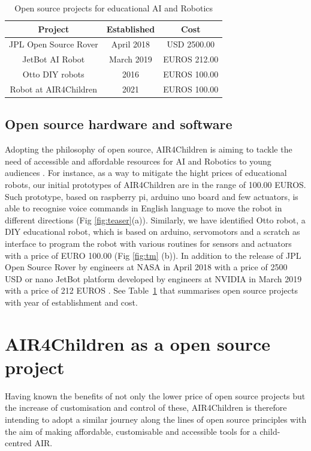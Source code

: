 \documentclass[sigconf]{acmart}
\begin{document}

\begin{table}
  \begin{tabular}{ccc}
    \toprule
    Project & Established  & Cost\\
    \midrule
    JPL Open Source Rover \cite{OSR:2018} & April 2018  &  USD 2500.00 \\
    JetBot AI Robot \cite{nanoJetBot:2019} & March 2019  & EUROS 212.00    \\
    Otto DIY robots \cite{OttoDIY:2016} & 2016 &  EUROS 100.00  \\
    Robot at AIR4Children & 2021 & EUROS 100.00  \\
  \bottomrule
\end{tabular}
\caption{Open source projects for educational AI and Robotics}
\label{tab:opensourceprojects}
\end{table}

\subsection{Open source hardware and software}
Adopting the philosophy of open source, AIR4Children is aiming to tackle the need of accessible and affordable resources for AI and Robotics to young audiences \cite{UNICEF2020}.
For instance, as a way to mitigate the hight prices of educational robots, our initial prototypes of AIR4Children are in the range of 100.00 EUROS. 
Such prototype, based on raspberry pi, arduino uno board and few actuators, is able to recognise voice commands in English language to move the robot in different directions (Fig \ref{fig:teaser}(a)).
Similarly, we have identified Otto robot, a DIY educational robot, which is based on arduino, servomotors and a scratch as interface to program the robot with various routines for sensors and actuators with a price of EURO 100.00 (Fig \ref{fig:tm} (b)). 
In addition to the release of JPL Open Source Rover by engineers at NASA in April 2018 with a price of 2500 USD \cite{OSR:2018} or
nano JetBot platform developed by engineers at NVIDIA in March 2019 with a price of 212 EUROS \cite{nanoJetBot:2019}. 
See Table~\ref{tab:opensourceprojects} that summarises open source projects with year of establishment and cost.


\section{AIR4Children as a open source project}
Having known the benefits of not only the lower price of open source projects but the increase of customisation and control of these, AIR4Children is therefore intending to adopt a similar journey along the lines of open source principles with the aim of making affordable, customisable and accessible tools for a child-centred AIR.
\end{document}

